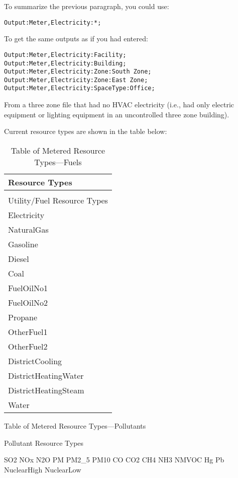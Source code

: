 To summarize the previous paragraph, you could use:

\begin{lstlisting}
Output:Meter,Electricity:*;
\end{lstlisting}

To get the same outputs as if you had entered:

\begin{lstlisting}
Output:Meter,Electricity:Facility;
Output:Meter,Electricity:Building;
Output:Meter,Electricity:Zone:South Zone;
Output:Meter,Electricity:Zone:East Zone;
Output:Meter,Electricity:SpaceType:Office;
\end{lstlisting}

From a three zone file that had no HVAC electricity (i.e., had only electric equipment or lighting equipment in an uncontrolled three zone building).

Current resource types are shown in the table below:

\begin{longtable}[c]{@{}l@{}}
\caption{Table of Metered Resource Types---Fuels \label{table:table-of-metered-resource-types}} \tabularnewline
\toprule
Resource Types \tabularnewline
\midrule
\endfirsthead

\caption[]{Table of Metered Resource Types---Fuels \label{table:table-of-metered-resource-types-Fuels}} \tabularnewline
\toprule
Utility/Fuel Resource Types \tabularnewline
\midrule
\endhead

Electricity \tabularnewline
NaturalGas \tabularnewline
Gasoline \tabularnewline
Diesel \tabularnewline
Coal \tabularnewline
FuelOilNo1 \tabularnewline
FuelOilNo2 \tabularnewline
Propane \tabularnewline
OtherFuel1 \tabularnewline
OtherFuel2 \tabularnewline
DistrictCooling \tabularnewline
DistrictHeatingWater \tabularnewline
DistrictHeatingSteam \tabularnewline
Water \tabularnewline
\bottomrule
\end{longtable}

\caption[]{Table of Metered Resource Types---Pollutants \label{table:table-of-metered-resource-types-pollutants}} \tabularnewline
\toprule
Pollutant Resource Types
\midrule
\endhead

SO2 \tabularnewline
NOx \tabularnewline
N2O \tabularnewline
PM \tabularnewline
PM2_5 \tabularnewline
PM10 \tabularnewline
CO \tabularnewline
CO2 \tabularnewline
CH4 \tabularnewline
NH3 \tabularnewline
NMVOC \tabularnewline
Hg \tabularnewline
Pb \tabularnewline
NuclearHigh \tabularnewline
NuclearLow \tabularnewline
\bottomrule

